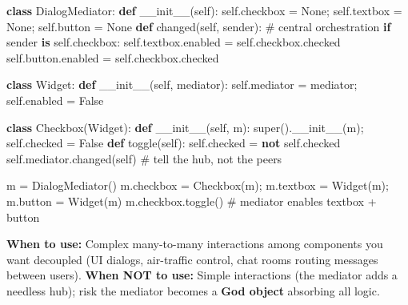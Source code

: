 \documentclass[11pt]{article}
\newenvironment{Shaded}{\begin{snugshade}}{\end{snugshade}}
\newcommand{\BuiltInTok}[1]{\textcolor[rgb]{0.50,0.55,0.55}{#1}}
\newcommand{\CommentTok}[1]{\textcolor[rgb]{0.48,0.49,0.49}{#1}}
\newcommand{\ControlFlowTok}[1]{\textcolor[rgb]{0.99,0.74,0.29}{\textbf{#1}}}
\newcommand{\FunctionTok}[1]{\textcolor[rgb]{0.56,0.27,0.68}{#1}}
\newcommand{\KeywordTok}[1]{\textcolor[rgb]{0.81,0.81,0.76}{\textbf{#1}}}
\newcommand{\NormalTok}[1]{\textcolor[rgb]{0.81,0.81,0.76}{#1}}
\newcommand{\OperatorTok}[1]{\textcolor[rgb]{0.81,0.81,0.76}{#1}}
\newcommand{\VariableTok}[1]{\textcolor[rgb]{0.15,0.68,0.68}{#1}}
\begin{document}
\begin{Shaded}
\begin{Highlighting}[]
\KeywordTok{class}\NormalTok{ DialogMediator:}
    \KeywordTok{def} \FunctionTok{\_\_init\_\_}\NormalTok{(}\VariableTok{self}\NormalTok{):}
        \VariableTok{self}\NormalTok{.checkbox }\OperatorTok{=} \VariableTok{None}\OperatorTok{;} \VariableTok{self}\NormalTok{.textbox }\OperatorTok{=} \VariableTok{None}\OperatorTok{;} \VariableTok{self}\NormalTok{.button }\OperatorTok{=} \VariableTok{None}
    \KeywordTok{def}\NormalTok{ changed(}\VariableTok{self}\NormalTok{, sender):                 }\CommentTok{\# central orchestration}
        \ControlFlowTok{if}\NormalTok{ sender }\KeywordTok{is} \VariableTok{self}\NormalTok{.checkbox:}
            \VariableTok{self}\NormalTok{.textbox.enabled }\OperatorTok{=} \VariableTok{self}\NormalTok{.checkbox.checked}
            \VariableTok{self}\NormalTok{.button.enabled  }\OperatorTok{=} \VariableTok{self}\NormalTok{.checkbox.checked}

\KeywordTok{class}\NormalTok{ Widget:}
    \KeywordTok{def} \FunctionTok{\_\_init\_\_}\NormalTok{(}\VariableTok{self}\NormalTok{, mediator): }\VariableTok{self}\NormalTok{.mediator }\OperatorTok{=}\NormalTok{ mediator}\OperatorTok{;} \VariableTok{self}\NormalTok{.enabled }\OperatorTok{=} \VariableTok{False}

\KeywordTok{class}\NormalTok{ Checkbox(Widget):}
    \KeywordTok{def} \FunctionTok{\_\_init\_\_}\NormalTok{(}\VariableTok{self}\NormalTok{, m): }\BuiltInTok{super}\NormalTok{().}\FunctionTok{\_\_init\_\_}\NormalTok{(m)}\OperatorTok{;} \VariableTok{self}\NormalTok{.checked }\OperatorTok{=} \VariableTok{False}
    \KeywordTok{def}\NormalTok{ toggle(}\VariableTok{self}\NormalTok{):}
        \VariableTok{self}\NormalTok{.checked }\OperatorTok{=} \KeywordTok{not} \VariableTok{self}\NormalTok{.checked}
        \VariableTok{self}\NormalTok{.mediator.changed(}\VariableTok{self}\NormalTok{)            }\CommentTok{\# tell the hub, not the peers}

\NormalTok{m }\OperatorTok{=}\NormalTok{ DialogMediator()}
\NormalTok{m.checkbox }\OperatorTok{=}\NormalTok{ Checkbox(m)}\OperatorTok{;}\NormalTok{ m.textbox }\OperatorTok{=}\NormalTok{ Widget(m)}\OperatorTok{;}\NormalTok{ m.button }\OperatorTok{=}\NormalTok{ Widget(m)}
\NormalTok{m.checkbox.toggle()      }\CommentTok{\# mediator enables textbox + button}
\end{Highlighting}
\end{Shaded}

\textbf{When to use:} Complex many-to-many interactions among components you want decoupled (UI dialogs, air-traffic control, chat rooms routing messages between users). \textbf{When NOT to use:} Simple interactions (the mediator adds a needless hub); risk the mediator becomes a \textbf{God object} absorbing all logic.
\end{document}
